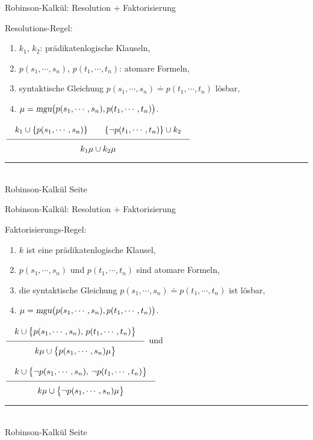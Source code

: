 \documentclass{slides}
\newcommand{\myrule}{\rule{20cm}{1mm}\\ }
\newcommand{\schluss}[2]{\frac{\displaystyle\quad \rule[-8pt]{0pt}{18pt}#1 \quad}{\displaystyle\quad \rule{0pt}{14pt}#2 \quad}}
\newcounter{mypage}
\begin{document}

\begin{slide}{}
\normalsize
\begin{center}
Robinson-Kalkül: Resolution + Faktorisierung
\end{center}
\vspace{0.5cm}

\footnotesize
Resolutions-Regel: 
\begin{enumerate}
\item $k_1$, $k_2$:  prädikatenlogische Klauseln,
\item $p(s_1,\cdots,s_n)$, $p(t_1,\cdots,t_n)$: atomare Formeln,
\item syntaktische Gleichung $p(s_1,\cdots,s_n)  \doteq p(t_1,\cdots,t_n)$ lösbar, 
\item $\mu = \textsl{mgu}\bigl(p(s_1,\cdots,s_n), p(t_1,\cdots,t_n)\bigr)$.
\end{enumerate}
\hspace*{1.3cm} $\schluss{k_1 \cup\{ p(s_1,\cdots,s_n)\} \quad\quad \{\neg p(t_1,\cdots,t_n)\} \cup k_2}{k_1\mu \cup k_2\mu}$ 

\vspace*{\fill}
\tiny \addtocounter{mypage}{1}
\myrule
Robinson-Kalkül \hspace*{\fill} Seite 
\end{slide}


\begin{slide}{}
\normalsize
\begin{center}
Robinson-Kalkül: Resolution + Faktorisierung
\end{center}
\vspace{0.5cm}

\footnotesize
Faktorisierungs-Regel:
\begin{enumerate}
\item $k$ ist  eine prädikatenlogische Klausel,
\item $p(s_1,\cdots,s_n)$ und $p(t_1,\cdots,t_n)$ sind atomare Formeln,
\item die syntaktische Gleichung $p(s_1,\cdots,s_n)  \doteq p(t_1,\cdots,t_n)$ ist lösbar, 
\item $\mu = \textsl{mgu}\bigl(p(s_1,\cdots,s_n), p(t_1,\cdots,t_n)\bigr)$.
\end{enumerate}
\hspace*{1.8cm}
$\schluss{k \cup \bigl\{p(s_1,\cdots,s_n),\, p(t_1,\cdots,t_n)\bigl\}}{k\mu \cup \bigl\{p(s_1,\cdots,s_n)\mu\bigr\} }$ 
\quad und 

\hspace*{1.8cm}
$\schluss{k \cup \bigl\{ \neg p(s_1,\cdots,s_n),\, \neg p(t_1,\cdots,t_n)\bigl\}}{k\mu \cup \bigl\{\neg p(s_1,\cdots,s_n)\mu\bigr\} }$ 



\vspace*{\fill}
\tiny \addtocounter{mypage}{1}
\myrule
Robinson-Kalkül \hspace*{\fill} Seite 
\end{slide}
\end{document}
